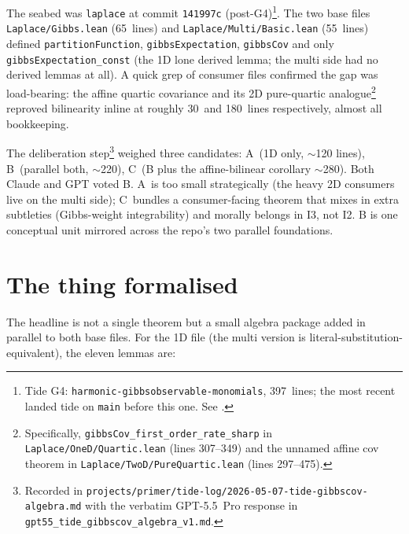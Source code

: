 \documentclass[11pt]{article}
\begin{document}
The seabed was \texttt{laplace} at commit \texttt{141997c}
(post-G4)\footnote{Tide G4: \texttt{harmonic-gibbsobservable-monomials},
397~lines; the most recent landed tide on \texttt{main} before this
one. See .}.
The two base files
\texttt{Laplace/Gibbs.lean} (65~lines) and
\texttt{Laplace/Multi/Basic.lean} (55~lines) defined
\texttt{partitionFunction}, \texttt{gibbsExpectation},
\texttt{gibbsCov} and only \texttt{gibbsExpectation\_const} (the 1D
lone derived lemma; the multi side had no derived lemmas at all). A
quick grep of consumer files confirmed the gap was load-bearing:
the affine quartic covariance and its 2D pure-quartic
analogue\footnote{Specifically, \texttt{gibbsCov\_first\_order\_rate\_sharp}
in \texttt{Laplace/OneD/Quartic.lean} (lines 307--349) and the
unnamed affine cov theorem in \texttt{Laplace/TwoD/PureQuartic.lean}
(lines 297--475).}
reproved bilinearity inline at roughly 30~and 180~lines respectively,
almost all bookkeeping.

The deliberation step\footnote{Recorded in
\texttt{projects/primer/tide-log/2026-05-07-tide-gibbscov-algebra.md}
with the verbatim GPT-5.5~Pro response in
\texttt{gpt55\_tide\_gibbscov\_algebra\_v1.md}.} weighed three
candidates: A~(1D only, $\sim$120 lines), B~(parallel both,
$\sim$220), C~(B plus the affine-bilinear corollary $\sim$280).
Both Claude and GPT voted B. A~is too small strategically (the heavy
2D consumers live on the multi side); C~bundles a consumer-facing
theorem that mixes in extra subtleties (Gibbs-weight integrability)
and morally belongs in I3, not I2. B is one conceptual unit mirrored
across the repo's two parallel foundations.

\section{The thing formalised}

The headline is not a single theorem but a small algebra package added
in parallel to both base files. For the 1D file (the multi version is
literal-substitution-equivalent), the eleven lemmas are:
\end{document}
